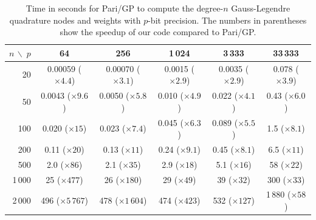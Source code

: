 \documentclass[nohypdvips,review]{siamart0216}
\begin{document}

\begin{table}[t!]
\caption{Time in seconds for Pari/GP to compute the degree-$n$ Gauss-Legendre quadrature nodes and weights with $p$-bit precision. The
numbers in parentheses show the speedup of our code compared to Pari/GP.}
\label{tab:parispeedup}
\begin{center}
\setlength{\tabcolsep}{1ex}
\begin{tabular}{ r | c c c c c }
$n\, \backslash \; p$ & 64 & 256 & 1\,024 & 3\,333 & 33\,333 \\ \hline\rule{0pt}{3ex}
20      & 0.00059 (\footnotesize{$\times 4.4$)}  &  0.00070 (\footnotesize{$\times 3.1$)}  &  0.0015 (\footnotesize{$\times 2.9$)}  &  0.0035 (\footnotesize{$\times 2.9$)}  &  0.078 (\footnotesize{$\times 3.9$)}  \\
50      & 0.0043 (\footnotesize{$\times 9.6$)}  &  0.0050 (\footnotesize{$\times 5.8$)} &  0.010 (\footnotesize{$\times 4.9$)}  &  0.022 (\footnotesize{$\times 4.1$)} &  0.43 (\footnotesize{$\times 6.0$)}  \\
100     &  0.020 (\footnotesize{$\times 15$)}   &   0.023 (\footnotesize{$\times 7.4$)}  &   0.045 (\footnotesize{$\times 6.3$)}  &  0.089 (\footnotesize{$\times 5.5$)} &  1.5 (\footnotesize{$\times 8.1$)}  \\
200     &  0.11 (\footnotesize{$\times 20$)}   &  0.13 (\footnotesize{$\times 11$)}  &  0.24 (\footnotesize{$\times 9.1$)}  &  0.45 (\footnotesize{$\times 8.1$)}  &  6.5 (\footnotesize{$\times 11$)}  \\
500     &  2.0 (\footnotesize{$\times 86$)}     & 2.1 (\footnotesize{$\times 35$)}  &  2.9 (\footnotesize{$\times 18$)}  &  5.1 (\footnotesize{$\times 16$)}  &  58 (\footnotesize{$\times 22$)}  \\
1\,000  & 25 (\footnotesize{$\times 477$)}    &  26 (\footnotesize{$\times 180$)} &  29 (\footnotesize{$\times 49$)}  &  39 (\footnotesize{$\times 32$)}  & 300 (\footnotesize{$\times 33$)} \\
2\,000  &  496 (\footnotesize{$\times 5\,767$)}   & 478 (\footnotesize{$\times 1\,604$)}  &  474 (\footnotesize{$\times 423$)}  &  532 (\footnotesize{$\times 127$)}  &  1\,880 (\footnotesize{$\times 58$)}  \\
\end{tabular}
\end{center}
\end{table}
\end{document}
